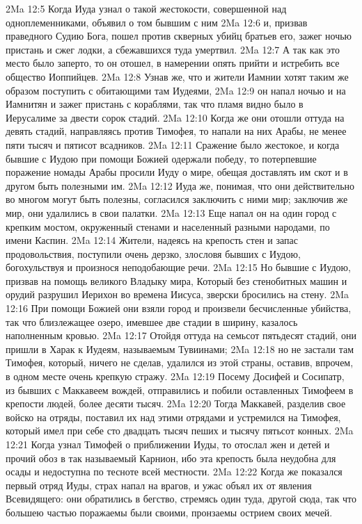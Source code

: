 \vs 2Ma 12:5 Когда Иуда узнал о такой жестокости, совершенной над одноплеменниками, объявил о том бывшим с ним
\vs 2Ma 12:6 и, призвав праведного Судию Бога, пошел против скверных убийц братьев его, зажег ночью пристань и сжег лодки, а сбежавшихся туда умертвил.
\vs 2Ma 12:7 А так как это место было заперто, то он отошел, в намерении опять прийти и истребить все общество Иоппийцев.
\vs 2Ma 12:8 Узнав же, что и жители Иамнии хотят таким же образом поступить с обитающими там Иудеями,
\vs 2Ma 12:9 он напал ночью и на Иамнитян и зажег пристань с кораблями, так что пламя видно было в Иерусалиме за двести сорок стадий.
\rsbpar\vs 2Ma 12:10 Когда же они отошли оттуда на девять стадий, направляясь против Тимофея, то напали на них Арабы, не менее пяти тысяч и пятисот всадников.
\vs 2Ma 12:11 Сражение было жестокое, и когда бывшие с Иудою при помощи Божией одержали победу, то потерпевшие поражение номады Арабы просили Иуду о мире, обещая доставлять им скот и в другом быть полезными им.
\vs 2Ma 12:12 Иуда же, понимая, что они действительно во многом могут быть полезны, согласился заключить с ними мир; заключив же мир, они удалились в свои палатки.
\vs 2Ma 12:13 Еще напал он на один город с крепким мостом, окруженный стенами и населенный разными народами, по имени Каспин.
\vs 2Ma 12:14 Жители, надеясь на крепость стен и запас продовольствия, поступили очень дерзко, злословя бывших с Иудою, богохульствуя и произнося неподобающие речи.
\vs 2Ma 12:15 Но бывшие с Иудою, призвав на помощь великого Владыку мира, Который без стенобитных машин и орудий разрушил Иерихон во времена Иисуса, зверски бросились на стену.
\vs 2Ma 12:16 При помощи Божией они взяли город и произвели бесчисленные убийства, так что близлежащее озеро, имевшее две стадии в ширину, казалось наполненным кровью.
\rsbpar\vs 2Ma 12:17 Отойдя оттуда на семьсот пятьдесят стадий, они пришли в Харак к Иудеям, называемым Тувиинами;
\vs 2Ma 12:18 но не застали там Тимофея, который, ничего не сделав, удалился из этой страны, оставив, впрочем, в одном месте очень крепкую стражу.
\vs 2Ma 12:19 Посему Досифей и Сосипатр, из бывших с Маккавеем вождей, отправились и побили оставленных Тимофеем в крепости людей, более десяти тысяч.
\vs 2Ma 12:20 Тогда Маккавей, разделив свое войско на отряды, поставил их над этими отрядами и устремился на Тимофея, который имел при себе сто двадцать тысяч пеших и тысячу пятьсот конных.
\vs 2Ma 12:21 Когда узнал Тимофей о приближении Иуды, то отослал жен и детей и прочий обоз в так называемый Карнион, ибо эта крепость была неудобна для осады и недоступна по тесноте всей местности.
\vs 2Ma 12:22 Когда же показался первый отряд Иуды, страх напал на врагов, и ужас объял их от явления Всевидящего: они обратились в бегство, стремясь один туда, другой сюда, так что большею частью поражаемы были своими, пронзаемы острием своих мечей.
